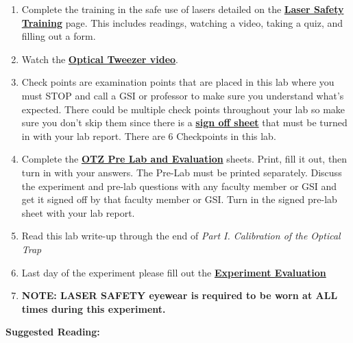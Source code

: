 \documentclass{../lab}
\begin{document}
\begin{enumerate}
    \item Complete the training in the safe use of lasers detailed on the \href{http://experimentationlab.berkeley.edu/LaserSafety}{\textbf{Laser Safety Training}} page. This includes readings, watching a video, taking a quiz, and filling out a form.

    \item Watch the \href{http://youtu.be/bqIBcjcAhso}{\textbf{Optical Tweezer video}}.
    
\newpage    

    \item Check points are examination points that are placed in this lab where you must STOP and call a GSI or professor to make sure you understand what's expected. There could  be multiple check points throughout your lab so make sure you don't skip them since there is a \href{http://experimentationlab.berkeley.edu/otzcheckpoints}{\textbf{sign off sheet}} that must be turned in with your lab report. There are 6 Checkpoints in this lab.

    \item Complete the \href{http://experimentationlab.berkeley.edu/OTZprelab}{\textbf{OTZ Pre Lab and Evaluation}} sheets. Print, fill it out, then turn in with your answers. The Pre-Lab must be printed separately. Discuss the experiment and pre-lab questions with any faculty member or GSI and get it signed off by that faculty member or GSI. Turn in the signed pre-lab sheet with your lab report.

    \item Read this lab write-up through the end of \emph{Part I. Calibration of the Optical Trap}

    \item Last day of the experiment please fill out the \href{\ExperimentEvaluation}{\textbf{Experiment Evaluation}}

    \item \textbf{NOTE: LASER  SAFETY eyewear is required to be worn at ALL times during this experiment.}

\end{enumerate}

\textbf{Suggested Reading:}
\end{document}
